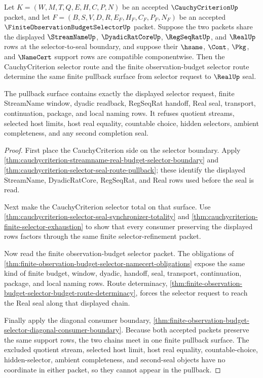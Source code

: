 
\begin{theorem}
\label{thm:cauchycriterion-finite-observation-budget-selector-pullback}
Let $K=(W,M,T,Q,E,H,C,P,N)$ be an accepted $\CauchyCriterionUp$ packet, and
let $F=(B,S,V,D,R,E_F,H_F,C_F,P_F,N_F)$ be an accepted
$\FiniteObservationBudgetSelectorUp$ packet. Suppose the two packets share the
displayed $\StreamNameUp$, $\DyadicRatCoreUp$, $\RegSeqRatUp$, and $\RealUp$
rows at the selector-to-seal boundary, and suppose their $\hsame$, $\Cont$,
$\Pkg$, and $\NameCert$ support rows are compatible componentwise. Then the
CauchyCriterion selector route and the finite observation-budget selector
route determine the same finite pullback surface from selector request to
$\RealUp$ seal.

The pullback surface contains exactly the displayed selector request, finite
StreamName window, dyadic readback, RegSeqRat handoff, Real seal, transport,
continuation, package, and local naming rows. It refuses quotient streams,
selected host limits, host real equality, countable choice, hidden selectors,
ambient completeness, and any second completion seal.
\end{theorem}
\begin{proof}
First place the CauchyCriterion side on the selector boundary. Apply
\autoref{thm:cauchycriterion-streamname-real-budget-selector-boundary} and
\autoref{thm:cauchycriterion-selector-seal-route-pullback}; these identify the
displayed StreamName, DyadicRatCore, RegSeqRat, and Real rows used before the
seal is read.

Next make the CauchyCriterion selector total on that surface. Use
\autoref{thm:cauchycriterion-selector-seal-synchronizer-totality} and
\autoref{thm:cauchycriterion-finite-selector-exhaustion} to show that every
consumer preserving the displayed rows factors through the same finite
selector-refinement packet.

Now read the finite observation-budget selector packet. The obligations of
\autoref{thm:finite-observation-budget-selector-namecert-obligations} expose
the same kind of finite budget, window, dyadic, handoff, seal, transport,
continuation, package, and local naming rows. Route determinacy,
\autoref{thm:finite-observation-budget-selector-budget-route-determinacy},
forces the selector request to reach the Real seal along that displayed chain.

Finally apply the diagonal consumer boundary,
\autoref{thm:finite-observation-budget-selector-diagonal-consumer-boundary}.
Because both accepted packets preserve the same support rows, the two chains
meet in one finite pullback surface. The excluded quotient stream, selected
host limit, host real equality, countable-choice, hidden-selector, ambient
completeness, and second-seal objects have no coordinate in either packet, so
they cannot appear in the pullback.
\end{proof}

